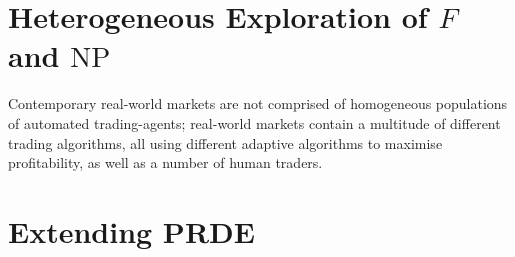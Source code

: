 \documentclass[conference]{IEEEtran}
\begin{document}
\section{Heterogeneous Exploration of $F$ and $\mathrm{NP}$}

Contemporary real-world markets are not comprised of homogeneous populations of automated trading-agents; real-world markets contain a multitude of different trading algorithms, all using different adaptive algorithms to maximise profitability, as well as a number of human traders.

\section{Extending PRDE}



\end{document}
